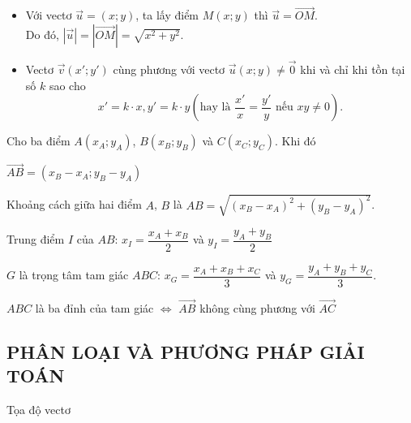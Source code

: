 \begin{khung4}{}
	\begin{itemize}
	\item Với vectơ $\overrightarrow{u}=\left(x; y\right)$, ta lấy điểm $M\left(x; y\right)$ thì $\overrightarrow{u}=\overrightarrow{OM}$. \\ Do đó, $\left|\overrightarrow{u}\right|=\left|\overrightarrow{OM}\right|=\sqrt{x^2+y^2}$.
	\item Vectơ $\overrightarrow{v}\left(x'; y'\right)$ cùng phương với vectơ $\overrightarrow{u}\left(x; y\right)\ne\overrightarrow{0}$ khi và chỉ khi tồn tại số $k$ sao cho $$x'=k\cdot x, y'=k\cdot y \left(\text{hay là } \dfrac{x'}{x}=\dfrac{y'}{y} \text{ nếu } xy\ne0\right).$$
	\end{itemize}
\end{khung4}
\begin{khung4}{}
	Cho ba điểm $A\left( x_A;y_A \right)$, $B\left( x_B;y_B\right)$ và $C\left( x_C;y_C\right)$. Khi đó
	\begin{listEX}[1]
		\item [\ding{172}] $\overrightarrow{AB}=\left( x_B-x_A;y_B-y_A\right)$ 
		\item [\ding{173}] Khoảng cách giữa hai điểm $A$, $B$ là $AB=\sqrt{\left( x_B-x_A\right)^2+\left(y_B-y_A\right)^2}$.
		\item [\ding{174}] Trung điểm $I$ của $AB$:	$x_I=\dfrac{x_A+x_B}{2}$ và $y_I=\dfrac{y_A+y_B}{2}$
		\item [\ding{175}] $G$ là trọng tâm tam giác $ABC$: 
		$x_G=\dfrac{x_A+x_B+x_C}{3}$ và $y_G=\dfrac{y_A+y_B+y_C}{3}$.
		\item [\ding{176}] $ABC$ là ba đỉnh của tam giác $\Leftrightarrow $ $\overrightarrow{AB}$ không cùng phương với $\overrightarrow{AC}$
\end{listEX}
\end{khung4}
\subsection{PHÂN LOẠI VÀ PHƯƠNG PHÁP GIẢI TOÁN}

\begin{dang}{Tọa độ vectơ}
	
\end{dang}

